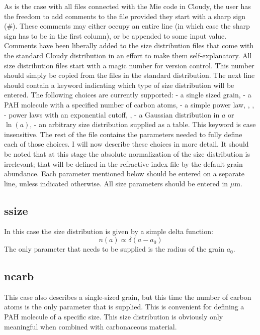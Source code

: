 As is the case with all files connected with the Mie code in Cloudy, the user
has the freedom to add comments to the file provided they start with a sharp
sign (\#). These comments may either occupy an entire line (in which case the
sharp sign has to be in the first column), or be appended to some input value.
Comments have been liberally added to the size distribution files that come
with the standard Cloudy distribution in an effort to make them
self-explanatory. All size distribution files start with a magic number for
version control. This number should simply be copied from the files in the
standard distribution. The next line should contain a keyword indicating which
type of size distribution will be entered. The following choices are currently
supported:  - a single sized grain,  - a
PAH molecule with a specified number of carbon atoms,  - a
simple power law, , ,  -
power laws with an exponential cutoff, ,
 - a Gaussian distribution in $a$ or $\ln(a)$,
 - an arbitrary size distribution supplied as a table. This
keyword is case insensitive. The rest of the file contains the parameters
needed to fully define each of those choices. I will now describe these
choices in more detail. It should be noted that at this stage the absolute
normalization of the size distribution is irrelevant; that will be defined in
the refractive index file by the default grain abundance. Each parameter
mentioned below should be entered on a separate line, unless indicated
otherwise. All size parameters should be entered in $\mu$m.

\subsection{ssize}

In this case the size distribution is given by a simple delta function:
\[ n(a) \propto \delta(a - a_0) \]
The only parameter that needs to be supplied is the radius of the grain
$a_0$.

\subsection{ncarb}

This case also describes a single-sized grain, but this time the number
of carbon atoms is the only parameter that is supplied. This is convenient
for defining a PAH molecule of a specific size. This size distribution is
obviously only meaningful when combined with carbonaceous material.

